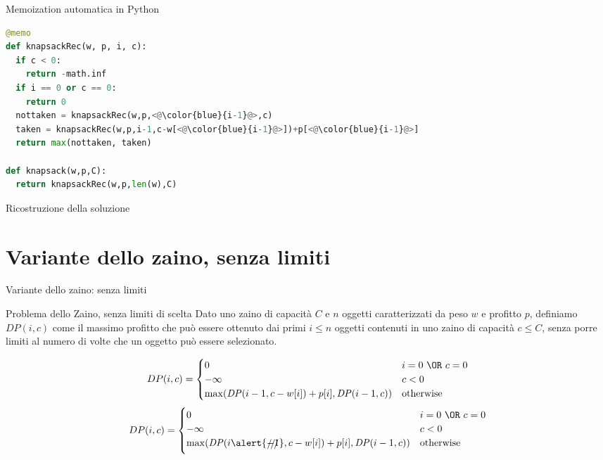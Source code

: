 \begin{frame}[fragile]{Memoization automatica in Python}
\begin{lstlisting}[language=python]
@memo
def knapsackRec(w, p, i, c):
  if c < 0:
    return -math.inf
  if i == 0 or c == 0:
    return 0
  nottaken = knapsackRec(w,p,<@\color{blue}{i-1}@>,c)
  taken = knapsackRec(w,p,i-1,c-w[<@\color{blue}{i-1}@>])+p[<@\color{blue}{i-1}@>]
  return max(nottaken, taken) 

def knapsack(w,p,C):
  return knapsackRec(w,p,len(w),C)

\end{lstlisting}



\end{frame}


\begin{frame}{Ricostruzione della soluzione}


\end{frame}

\section{Variante dello zaino, senza limiti}


\begin{frame}{Variante dello zaino: senza limiti}

\begin{block}{Problema dello Zaino, senza limiti di scelta}
Dato uno zaino di capacità $C$ e $n$ oggetti caratterizzati
da peso $w$ e profitto $p$, definiamo $\mathit{DP}(i,c)$ come il
massimo profitto che può essere ottenuto dai primi $i \leq n$
oggetti contenuti in uno zaino di capacità $c \leq C$, \alert{senza porre
limiti al numero di volte che un oggetto può essere selezionato}.
\end{block}

\bigskip
{}

\small
\begin{overprint}
\[
DP(i,c) = \begin{cases}
  0 & i=0\ \OR\ c=0 \\
  -\infty & c < 0 \\
  \max( \mathit{DP}(i-1,c-w[i]) + p[i], \mathit{DP}(i-1,c) ) & \textrm{otherwise}
\end{cases}
\]
\[
DP(i,c) = \begin{cases}
  0 & i=0\ \OR\ c=0 \\
  -\infty & c < 0 \\
  \max( \mathit{DP}(i\alert{\xout{-1}},c-w[i]) + p[i], \mathit{DP}(i-1,c) ) & \textrm{otherwise}
\end{cases}
\]
\end{overprint}

\end{frame}

